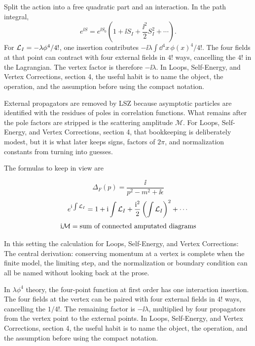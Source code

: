 Split the action into a free quadratic part and an interaction.  In the path integral,
\[
  e^{\ii S}=e^{\ii S_0}\left(1+\ii S_I+\frac{\ii^2}{2}S_I^2+\cdots\right).
\]
For \(\mathcal L_I=-\lambda\phi^4/4!\), one insertion contributes \(-\ii\lambda\int\dd^4x\,\phi(x)^4/4!\).  The four fields at that point can contract with four external fields in \(4!\) ways, cancelling the \(4!\) in the Lagrangian.  The vertex factor is therefore \(-\ii\lambda\).  In Loops, Self-Energy, and Vertex Corrections, section 4, the useful habit is to name the object, the operation, and the assumption before using the compact notation.

External propagators are removed by LSZ because asymptotic particles are identified with the residues of poles in correlation functions.  What remains after the pole factors are stripped is the scattering amplitude \(\mathcal M\).  For Loops, Self-Energy, and Vertex Corrections, section 4, that bookkeeping is deliberately modest, but it is what later keeps signs, factors of \(2\pi\), and normalization constants from turning into guesses.

The formulas to keep in view are

\[
  \Delta_F(p)=\frac{\ii}{p^2-m^2+\ii\epsilon}
\]
\[
  e^{\mathrm i\int\mathcal L_I}=1+\mathrm i\int\mathcal L_I+\frac{\mathrm i^2}{2}\left(\int\mathcal L_I\right)^2+\cdots
\]
\[
  \mathrm i\mathcal M=\hbox{sum of connected amputated diagrams}
\]

In this setting the calculation for Loops, Self-Energy, and Vertex Corrections: The central derivation: conserving momentum at a vertex is complete when the finite model, the limiting step, and the normalization or boundary condition can all be named without looking back at the prose.




\begin{example}
In \(\lambda\phi^4\) theory, the four-point function at first order has one interaction insertion.  The four fields at the vertex can be paired with four external fields in \(4!\) ways, cancelling the \(1/4!\).  The remaining factor is \(-\ii\lambda\), multiplied by four propagators from the vertex point to the external points.  In Loops, Self-Energy, and Vertex Corrections, section 4, the useful habit is to name the object, the operation, and the assumption before using the compact notation.
\end{example}



